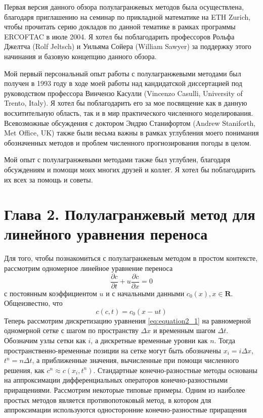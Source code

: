 Первая версия данного обзора полулагранжевых методов была осуществлена, благодаря приглашению на семинар по прикладной математике на ETH Zurich, чтобы прочитать серию докладов по данной тематике в рамках программы ERCOFTAC в июле 2004. Я хотел бы поблагодарить профессоров Рольфа Джелтча (Rolf Jeltsch) и Уильяма Сойера (William Sawyer) за поддержку этого начинания и базовую концепцию данного обзора.

Мой первый персональный опыт работы с полулагранжевыми методами был получен в 1993 году в ходе моей работы над кандидатской диссертацией под руководством профессора Винчензо Касулли (Vincenzo Casulli, University of Trento, Italy). Я хотел бы поблагодарить его за мое посвящение как в данную восхитительную область, так и в мир практического численного моделирования. Всевозможные обсуждения с доктором Эндрю Станифортом (Andrew Staniforth, Met Office, UK) также были весьма важны в рамках углубления моего понимания обозначенных методов и проблем численного прогнозирования погоды в целом.

Мой опыт с полулагранжевыми методами также был углублен, благодаря обсуждениям и помощи моих многих друзей и коллег. Я хотел бы поблагодарить их всех за помощь и советы.

\newpage

\chapter*{Глава 2. Полулагранжевый метод для линейного уравнения переноса} \label{chapt_2}
Для того, чтобы познакомиться с полулагранжевым методом в простом контексте, рассмотрим одномерное линейное уравнение переноса
%
\begin{equation}
\label{eq:equation2_1}
\frac{\partial c}{\partial t} + u\frac{\partial c}{\partial x} = 0
\end{equation}
%
с постоянным коэффициентом $u$ и с начальными данными $c_0(x), x\in{\mathbf{R}}$. Общеизвестно, что
%
\begin{equation}
\label{eq:equation2_2}
c(c,t)=c_0(x - ut)
\end{equation}
%
Теперь рассмотрим дискретизацию уравнения \eqref{eq:equation2_1} на равномерной одномерной сетке с шагом по пространству $\Delta x$ и временным шагом $\Delta t$. Обозначим узлы сетки как $i$, а дискретные временные уровни как $n$. Тогда пространственно-временные позиции на сетке могут быть обозначены $x_i=i\Delta{x}$, $t^n=n\Delta{t}$, а приближенные значения, вычисленные при помощи численного решения, как $c^n\approx c(x_i, t^n)$. Стандартные конечно-разностные методы основаны на аппроксимации дифференциальных операторов конечно-разностными приращениями. Рассмотрим некоторые типовые примеры. Одним из наиболее простых методов является противопотоковый метод, в котором для аппроксимации используются односторонние конечно-разностные приращения

